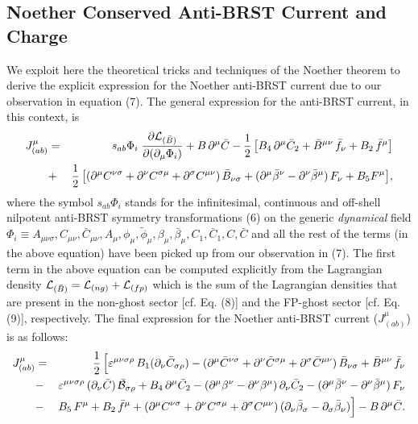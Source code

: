\documentclass[12pt]{article}
\begin{document}
\subsection{Noether Conserved Anti-BRST Current and Charge}



We exploit here the theoretical tricks and techniques of the Noether theorem to derive the explicit expression for the 
Noether anti-BRST current due to our observation in equation (7). The general expression for the anti-BRST current, in this context,
is 
\begin{eqnarray}\label{47}
J^\mu_{(ab)} &=&  s_{ab} \Phi_i \; \dfrac {\partial {\cal L}_{(\bar B)}}{\partial (\partial_\mu \Phi_i)} + B\, \partial^\mu \bar C 
- \dfrac{1}{2}\, \big [B_4 \, \partial^\mu \bar C_2  + \bar B^{\mu\nu}\, \bar f_\nu + B_2\, \bar f^\mu \big ]
\nonumber\\
&+& \dfrac{1}{2}\, \big [(\partial^\mu C^{\nu\sigma} + \partial^\nu C^{\sigma\mu} + \partial^\sigma C^{\mu\nu})\, \bar B_{\nu\sigma}
+ (\partial^\mu \bar \beta^\nu - \partial^\nu \bar \beta^\mu)\,  F_\nu  + B_5  F^\mu
  \big],
\end{eqnarray}
where the symbol $s_{ab} \Phi_i $ stands for the infinitesimal, continuous and off-shell 
nilpotent anti-BRST symmetry transformations (6) on the generic {\it dynamical} field 
$\Phi_i \equiv A_{\mu\nu\sigma},  C_{\mu\nu}, \bar C_{\mu\nu}, A_\mu, \phi_\mu, \tilde \phi_\mu, \beta_\mu, \bar \beta_\mu, C_1, \bar C_1, C, \bar C $ 
and all the rest of the terms (in the above equation) have been picked up from our observation in (7). The first term in the above
equation can be computed explicitly from the Lagrangian density ${\cal L}_{(\bar B)} = 
{\cal L}_{(ng)} + {\cal L}_{(fp)} $ which is the sum of the 
Lagrangian densities that are present in the non-ghost sector [cf. Eq. (8)] and
the FP-ghost sector [cf. Eq. (9)], respectively. The final expression for the Noether anti-BRST current ($J^\mu_{(ab)}$) is as follows:
\begin{eqnarray}\label{48}
J^\mu_{(ab)} &=&  \dfrac{1}{2}\, \Big [\varepsilon^{\mu\nu\sigma\rho}\, B_1 (\partial_\nu \bar C_{\sigma\rho}) 
-  (\partial^\mu  \bar C^{\nu\sigma} + \partial^\nu  \bar C^{\sigma\mu} + \partial^\sigma \bar C^{\mu\nu})\, \bar B_{\nu\sigma}
 + \bar B^{\mu\nu}\,\bar f_\nu  
\nonumber\\
&-& \varepsilon^{\mu\nu\sigma\rho}\, (\partial_\nu \bar C)\, \bar {\cal B}_{\sigma\rho} + B_4 \, \partial^\mu \bar C_2 - (\partial^\mu  \beta^\nu 
- \partial^\nu \beta^\mu)\, \partial_\nu \bar C_2 - (\partial^\mu \bar \beta^\nu - \partial^\nu \bar \beta^\mu)\,  F_\nu  \nonumber\\
&-& B_5\,  F^\mu + B_2 \, \bar f^\mu +(\partial^\mu  C^{\nu\sigma} + \partial^\nu  C^{\sigma\mu} + \partial^\sigma C^{\mu\nu})\,(\partial_\nu \bar \beta_\sigma 
- \partial_\sigma \bar \beta_\nu) \Big ] - B \, \partial^\mu \bar C.
\end{eqnarray}
\end{document}
